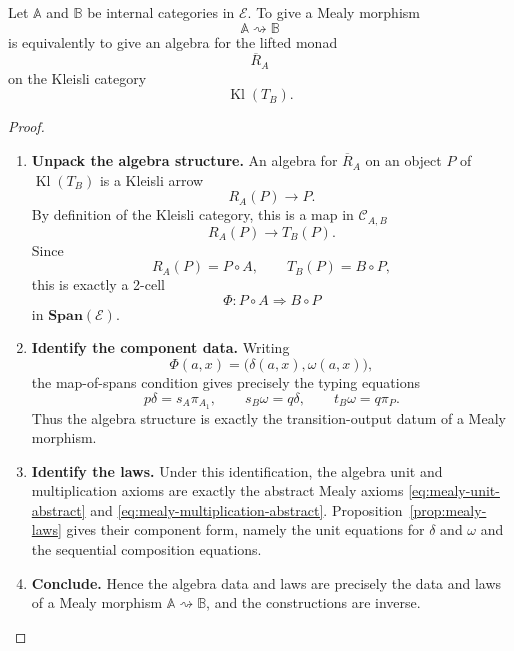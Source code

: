 \begin{theorem}
\label{thm:mealy-morphisms-kleisli-algebras}
    Let \(\mathbb A\) and \(\mathbb B\) be internal categories in \(\mathcal E\). To give a Mealy morphism
    \[
        \mathbb A\rightsquigarrow\mathbb B
    \]
    is equivalently to give an algebra for the lifted monad
    \[
        \overline R_A
    \]
    on the Kleisli category
    \[
        \operatorname{Kl}(T_B).
    \]
\end{theorem}
\begin{proof}
    \leavevmode
    \begin{enumerate}
        \item \textbf{Unpack the algebra structure.} An algebra for \(\overline R_A\) on an object \(P\) of \(\operatorname{Kl}(T_B)\) is a Kleisli arrow
        \[
            R_A(P)\to P.
        \]
        By definition of the Kleisli category, this is a map in \(\mathcal C_{A,B}\)
        \[
            R_A(P)\to T_B(P).
        \]
        Since
        \[
            R_A(P)=P\circ A,
            \qquad
            T_B(P)=B\circ P,
        \]
        this is exactly a 2-cell
        \[
            \Phi:P\circ A\Rightarrow B\circ P
        \]
        in \(\mathbf{Span}(\mathcal E)\).

        \item \textbf{Identify the component data.} Writing
        \[
            \Phi(a,x)=\bigl(\delta(a,x),\omega(a,x)\bigr),
        \]
        the map-of-spans condition gives precisely the typing equations
        \[
            p\delta=s_A\pi_{A_1},
            \qquad
            s_B\omega=q\delta,
            \qquad
            t_B\omega=q\pi_P.
        \]
        Thus the algebra structure is exactly the transition-output datum of a Mealy morphism.

        \item \textbf{Identify the laws.} Under this identification, the algebra unit and multiplication axioms are exactly the abstract Mealy axioms
        \eqref{eq:mealy-unit-abstract} and \eqref{eq:mealy-multiplication-abstract}. Proposition~\ref{prop:mealy-laws} gives their component form, namely the unit equations for \(\delta\) and \(\omega\) and the sequential composition equations.

        \item \textbf{Conclude.} Hence the algebra data and laws are precisely the data and laws of a Mealy morphism \(\mathbb A\rightsquigarrow\mathbb B\), and the constructions are inverse.
    \end{enumerate}
\end{proof}

